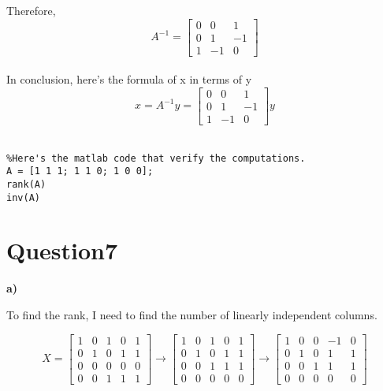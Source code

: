 \documentclass[paper=a4, fontsize=11pt]{scrartcl} %
\numberwithin{equation}{section} %
\numberwithin{figure}{section} %
\numberwithin{table}{section} %
\begin{document}
Therefore, 
$$
A^{-1} = 
\begin{bmatrix}
0 & 0 & 1 \\
0 & 1 & -1 \\
1 & -1 & 0 
\end{bmatrix}
$$\\

In conclusion, here's the formula of x in terms of y
$$
x = A^{-1} y =
\begin{bmatrix}
0 & 0 & 1 \\
0 & 1 & -1 \\
1 & -1 & 0 
\end{bmatrix}
y
$$\\


\begin{lstlisting} 
%Here's the matlab code that verify the computations. 
A = [1 1 1; 1 1 0; 1 0 0];
rank(A)
inv(A)
\end{lstlisting} 


\newpage
\section*{Question7}

\textbf{a)} 

To find the rank, I need to find the number of linearly independent columns.

$$
X = 
\begin{bmatrix}
1 & 0 & 1 & 0 & 1\\
0 & 1 & 0 & 1 & 1\\
0 & 0 & 0 & 0 & 0\\
0 & 0 & 1 & 1 & 1
\end{bmatrix}
\rightarrow
\begin{bmatrix}
1 & 0 & 1 & 0 & 1\\
0 & 1 & 0 & 1 & 1\\
0 & 0 & 1 & 1 & 1\\
0 & 0 & 0 & 0 & 0
\end{bmatrix}
\rightarrow
\begin{bmatrix}
1 & 0 & 0 & -1 & 0\\
0 & 1 & 0 & 1 & 1\\
0 & 0 & 1 & 1 & 1\\
0 & 0 & 0 & 0 & 0
\end{bmatrix}
$$\\
\end{document}
